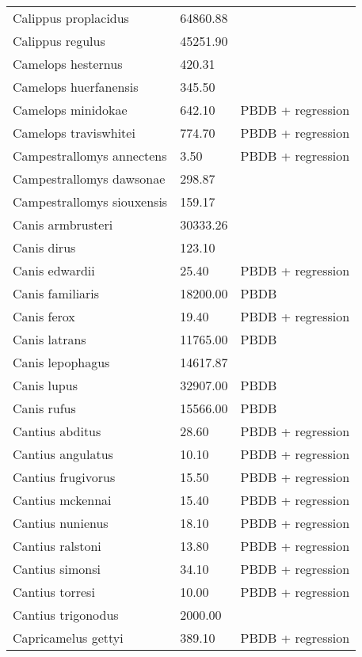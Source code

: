 \begin{longtable}{p{} p{} p{}}
    Calippus proplacidus & 64860.88 & \cite{Tomiya2013} \\ 
    Calippus regulus & 45251.90 & \cite{Tomiya2013} \\ 
    Camelops hesternus & 420.31 & \cite{Smith2004} \\ 
    Camelops huerfanensis & 345.50 & \cite{Smith2004} \\ 
    Camelops minidokae & 642.10 & PBDB + regression \\ 
    Camelops traviswhitei & 774.70 & PBDB + regression \\ 
    Campestrallomys annectens & 3.50 & PBDB + regression \\ 
    Campestrallomys dawsonae & 298.87 & \cite{Tomiya2013} \\ 
    Campestrallomys siouxensis & 159.17 & \cite{Tomiya2013} \\ 
    Canis armbrusteri & 30333.26 & \cite{Tomiya2013} \\ 
    Canis dirus & 123.10 & \cite{Smith2004} \\ 
    Canis edwardii & 25.40 & PBDB + regression \\ 
    Canis familiaris & 18200.00 & PBDB \\ 
    Canis ferox & 19.40 & PBDB + regression \\ 
    Canis latrans & 11765.00 & PBDB \\ 
    Canis lepophagus & 14617.87 & \cite{Tomiya2013} \\ 
    Canis lupus & 32907.00 & PBDB \\ 
    Canis rufus & 15566.00 & PBDB \\ 
    Cantius abditus & 28.60 & PBDB + regression \\ 
    Cantius angulatus & 10.10 & PBDB + regression \\ 
    Cantius frugivorus & 15.50 & PBDB + regression \\ 
    Cantius mckennai & 15.40 & PBDB + regression \\ 
    Cantius nunienus & 18.10 & PBDB + regression \\ 
    Cantius ralstoni & 13.80 & PBDB + regression \\ 
    Cantius simonsi & 34.10 & PBDB + regression \\ 
    Cantius torresi & 10.00 & PBDB + regression \\ 
    Cantius trigonodus & 2000.00 & \cite{Soligo2006} \\ 
    Capricamelus gettyi & 389.10 & PBDB + regression \\ 

\end{longtable}
